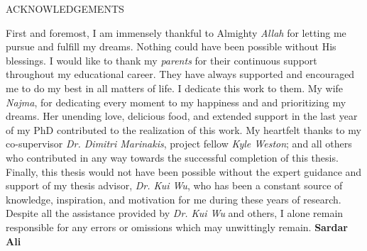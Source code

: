 \newpage
{}

\begin{center}
ACKNOWLEDGEMENTS
\end{center}\begin{flushright}
First and foremost, I am immensely thankful to Almighty \textit{Allah} for
letting me pursue and fulfill my dreams. Nothing could have been
possible without His blessings.
\newline
\newline
I would like to thank my \textit{parents} for their continuous support throughout my
educational career. They have always supported and encouraged me to do my best in all
matters of life. I dedicate this work to them.
\newline
\newline
My wife \textit{Najma}, for dedicating every moment to my happiness and and prioritizing my dreams. Her unending love, delicious food, and
extended support in the last year of my PhD contributed to the realization of this work.
\newline
\newline
My heartfelt thanks to my co-supervisor \textit{Dr. Dimitri Marinakis}, project fellow \textit{Kyle Weston}; and all
others who contributed in any way towards the successful completion of this thesis.
\newline
\newline
Finally, this thesis would not have been possible without the expert
guidance and support of my thesis advisor, \textit{Dr. Kui Wu}, who has been a constant
source of knowledge, inspiration, and motivation for me during these years of research. Despite
all the assistance provided by \textit{Dr. Kui Wu} and others, I alone
remain responsible for any errors or omissions which may unwittingly
remain.
\newline
\newline
\newline
\newline
\newline
\textbf{Sardar Ali} \end{flushright}